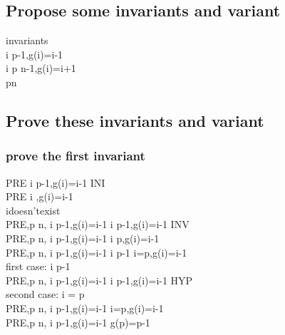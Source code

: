 \documentclass[11pt,a4paper,fleqn]{article}
\begin{document}
\subsection{Propose some invariants and variant}
\noindent
invariants \\
\forall i  \upto p-1,g(i)=i-1 \\
\forall i \in p \upto n-1,g(i)=i+1 \\
p\leq n\\
\subsection{ Prove these invariants and variant}
\subsubsection{prove the first invariant }
\noindent
PRE \vdash [g:=( \{0\} \domsub f)\cup \{n-1 \mapsto n\},p:=1]\forall i  \upto p-1,g(i)=i-1  \;INI \\
PRE \vdash [g:=( \{0\} \domsub f)\cup \{n-1 \mapsto n\}]\forall i  ,g(i)=i-1  \\
i\;doesn't\;exist \\
PRE,p \neq n, \forall i  \upto p-1,g(i)=i-1 \vdash [g(p):=p-1,p:=p+1]\forall i  \upto p-1,g(i)=i-1 \;INV \\
PRE,p \neq n, \forall i  \upto p-1,g(i)=i-1 \vdash [g(p):=p-1]\forall i  \upto p,g(i)=i-1 \\
PRE,p \neq n, \forall i  \upto p-1,g(i)=i-1 \vdash [g(p):=p-1]\forall i  \upto p-1 \cup i=p,g(i)=i-1 \\
first\; case:\; i  \upto p-1 \\
PRE,p \neq n, \forall i  \upto p-1,g(i)=i-1 \vdash [g(p):=p-1]\forall i  \upto p-1,g(i)=i-1 \; HYP \\
second\; case:\; i = p \\
PRE,p \neq n, \forall i  \upto p-1,g(i)=i-1 \vdash [g(p):=p-1]i=p,g(i)=i-1 \\
PRE,p \neq n, \forall i  \upto p-1,g(i)=i-1 \vdash [g(p):=p-1]g(p)=p-1 \\
\end{document}
